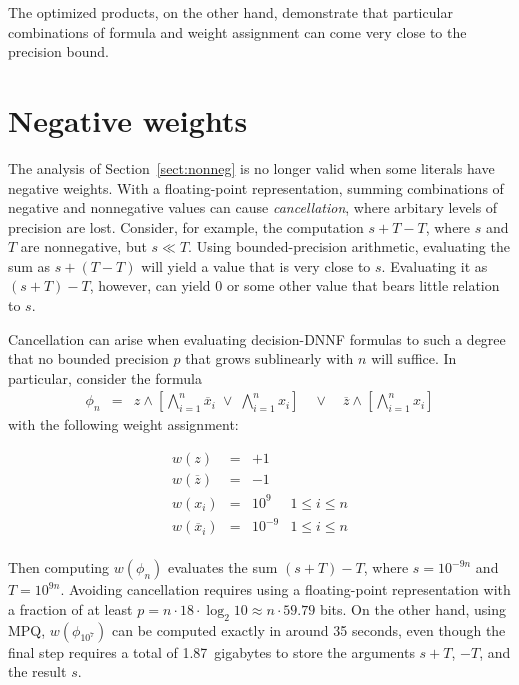 \documentclass[letterpaper,USenglish,cleveref, autoref, thm-restate]{lipics-v2021}
\newcommand{\obar}[1]{\overline{#1}}
\begin{document}
The optimized products, on the other hand, demonstrate that particular
combinations of formula and weight assignment can come very close to
the precision bound.


\section{Negative weights}
\label{sect:neg}

The analysis of Section~\ref{sect:nonneg} is no longer valid when
some literals have negative weights.  With a floating-point
representation, summing combinations of negative and nonnegative
values can cause \emph{cancellation}, where arbitary levels of
precision are lost.  Consider, for example, the computation
$s + T - T$, where $s$ and $T$ are nonnegative, but $s \ll T$.  Using
bounded-precision arithmetic, evaluating the sum as $s + (T - T)$ will yield a value
that is very close to $s$.
Evaluating it as $(s + T) - T$, however, can yield $0$ or some other value that bears little relation to $s$.

Cancellation can arise when evaluating decision-DNNF formulas to such a degree that no bounded precision $p$ that grows sublinearly with $n$ will suffice.
In particular, consider the formula
\begin{eqnarray}
\phi_n  & = & z \land \left[\bigwedge_{i = 1}^{n} \obar{x}_i \; \lor \; \bigwedge_{i = 1}^{n} x_i\right] \quad \lor \quad \obar{z} \land \left [\bigwedge_{i = 1}^{n} x_i\right] \label{eqn:max:precision}
\end{eqnarray}
with the following weight assignment:
\begin{center}
\begin{displaymath}
\begin{array}{llll}
  w(z) & = & +1 \\
  w(\obar{z}) & = & -1 \\
  w(x_i) & = & 10^9 & 1 \leq i \leq n \\
  w(\obar{x}_i) & = & 10^{-9} & 1 \leq i \leq n \\
\end{array}
\end{displaymath}
\end{center}
Then computing $w(\phi_n)$  evaluates the sum $(s + T) - T$, where
$s = 10^{-9n}$ and $T = 10^{9n}$.  Avoiding cancellation requires using a floating-point representation with a fraction of at least
$p = n \cdot 18 \cdot \log_2 10 \approx n \cdot 59.79$ bits.
On the other hand, using MPQ, $w(\phi_{10^7})$ can be computed exactly in around 35 seconds, even though the final step requires a total of 1.87~gigabytes to store the arguments
$s+T$, $-T$, and the result $s$.
\end{document}
